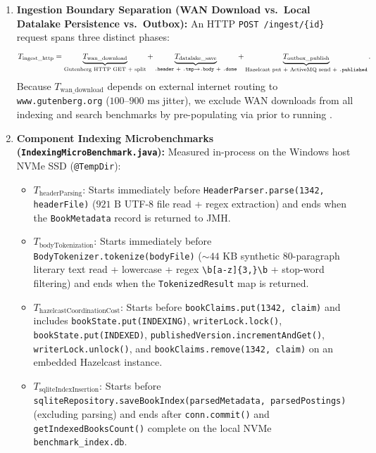 \documentclass[10pt,a4paper]{article}
\begin{document}
\begin{enumerate}[leftmargin=*,nosep]
    \item \textbf{Ingestion Boundary Separation (WAN Download vs.\ Local Datalake Persistence vs.\ Outbox):}
    An HTTP \texttt{POST /ingest/\{id\}} request spans three distinct phases:
    \[
        T_{\text{ingest\_http}} = \underbrace{T_{\text{wan\_download}}}_{\text{Gutenberg HTTP GET + split}} + \underbrace{T_{\text{datalake\_save}}}_{\text{\texttt{.header} + \texttt{.tmp}$\to$\texttt{.body} + \texttt{.done}}} + \underbrace{T_{\text{outbox\_publish}}}_{\text{Hazelcast put + ActiveMQ send + \texttt{.published}}}.
    \]
    Because $T_{\text{wan\_download}}$ depends on external internet routing to \texttt{www.gutenberg.org} ($100\text{--}900\text{ ms}$ jitter), we exclude WAN downloads from all indexing and search benchmarks by pre-populating  via  prior to running .
    \item \textbf{Component Indexing Microbenchmarks (\texttt{IndexingMicroBenchmark.java}):}
    Measured in-process on the Windows host NVMe SSD (\texttt{@TempDir}):
    \begin{itemize}[nosep]
        \item $T_{\text{headerParsing}}$: Starts immediately before \texttt{HeaderParser.parse(1342, headerFile)} ($921\text{ B}$ UTF-8 file read + regex extraction) and ends when the \texttt{BookMetadata} record is returned to JMH.
        \item $T_{\text{bodyTokenization}}$: Starts immediately before \texttt{BodyTokenizer.tokenize(bodyFile)} ($\sim 44\text{ KB}$ synthetic 80-paragraph literary text read + lowercase + regex \texttt{\textbackslash b[a-z]\{3,\}\textbackslash b} + stop-word filtering) and ends when the \texttt{TokenizedResult} map is returned.
        \item $T_{\text{hazelcastCoordinationCost}}$: Starts before \texttt{bookClaims.put(1342, claim)} and includes \texttt{bookState.put(INDEXING)}, \texttt{writerLock.lock()}, \texttt{bookState.put(INDEXED)}, \texttt{publishedVersion.incrementAndGet()}, \texttt{writerLock.unlock()}, and \texttt{bookClaims.remove(1342, claim)} on an embedded Hazelcast instance.
        \item $T_{\text{sqliteIndexInsertion}}$: Starts before \texttt{sqliteRepository.saveBookIndex(parsedMetadata, parsedPostings)} (excluding parsing) and ends after \texttt{conn.commit()} and \texttt{getIndexedBooksCount()} complete on the local NVMe \texttt{benchmark\_index.db}.

\end{itemize}
\end{enumerate}
\end{document}
